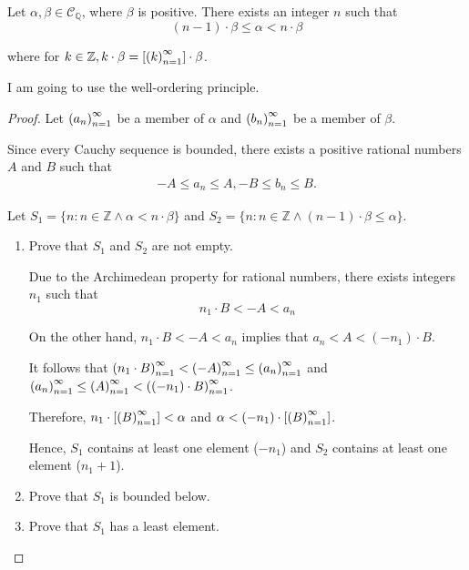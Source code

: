 \begin{theorem}
    Let $\alpha, \beta\in\mathscr{C}_{\mathbb{Q}}$, where $\beta$ is positive. There exists an integer $n$ such that
    \[
        (n-1)\cdot\beta \le \alpha < n\cdot\beta
    \]

    where for $k\in\mathbb{Z}, k\cdot\beta = \left[{{\left({k}\right)}^{\infty}_{n=1}}\right]\cdot\beta$.
\end{theorem}

I am going to use the well-ordering principle.

\begin{proof}
    Let ${\left({a_{n}}\right)}^{\infty}_{n=1}$ be a member of $\alpha$ and ${\left({b_{n}}\right)}^{\infty}_{n=1}$ be a member of $\beta$.

    Since every Cauchy sequence is bounded, there exists a positive rational numbers $A$ and $B$ such that
    \[
        \begin{split}
            -A \le a_{n} \le A,
            -B \le b_{n} \le B.
        \end{split}
    \]

    Let $S_{1} = \{ n : n\in\mathbb{Z} \land \alpha < n\cdot\beta \}$ and $S_{2} = \{ n : n\in\mathbb{Z}\land (n-1)\cdot\beta\le\alpha \}$.

    \begin{enumerate}[label={\textbf{Step \arabic*.}}]
        \item Prove that $S_{1}$ and $S_{2}$ are not empty.

              Due to the Archimedean property for rational numbers, there exists integers $n_{1}$ such that
              \[
                  n_{1}\cdot B < -A < a_{n}
              \]

              On the other hand, $n_{1}\cdot B < -A < a_{n}$ implies that $a_{n} < A < (-n_{1})\cdot B$.

              It follows that ${\left({n_{1}\cdot B}\right)}^{\infty}_{n=1} < {\left({-A}\right)}^{\infty}_{n=1} \le {\left({a_{n}}\right)}^{\infty}_{n=1}$ and ${\left({a_{n}}\right)}^{\infty}_{n=1}\le {\left({A}\right)}^{\infty}_{n=1} < {\left({(-n_{1})\cdot B}\right)}^{\infty}_{n=1}$.

              Therefore, $n_{1}\cdot\left[{{\left({B}\right)}^{\infty}_{n=1}}\right] < \alpha$ and $\alpha < (-n_{1})\cdot\left[{{\left({B}\right)}^{\infty}_{n=1}}\right]$.

              Hence, $S_{1}$ contains at least one element ($-n_{1}$) and $S_{2}$ contains at least one element ($n_{1} + 1$).
        \item Prove that $S_{1}$ is bounded below.
        \item Prove that $S_{1}$ has a least element.
    \end{enumerate}
\end{proof}

